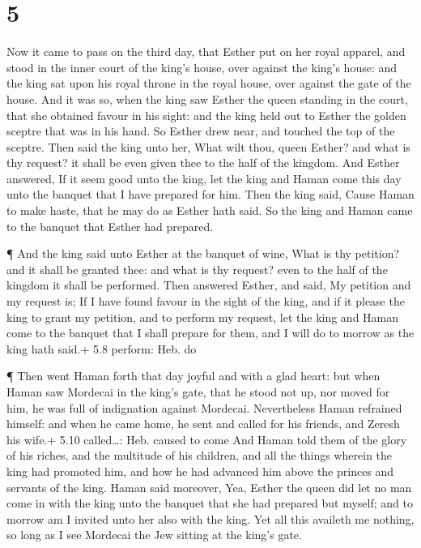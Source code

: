 \hypertarget{section-4}{%
\section{5}\label{section-4}}

 Now it came to pass on the third day, that Esther put on
her royal apparel, and stood in the inner court of the king's house,
over against the king's house: and the king sat upon his royal throne in
the royal house, over against the gate of the house.  And it
was so, when the king saw Esther the queen standing in the court, that
she obtained favour in his sight: and the king held out to Esther the
golden sceptre that was in his hand. So Esther drew near, and touched
the top of the sceptre.  Then said the king unto her, What
wilt thou, queen Esther? and what is thy request? it shall be even given
thee to the half of the kingdom.  And Esther answered, If it
seem good unto the king, let the king and Haman come this day unto the
banquet that I have prepared for him.  Then the king said,
Cause Haman to make haste, that he may do as Esther hath said. So the
king and Haman came to the banquet that Esther had prepared.

 ¶ And the king said unto Esther at the banquet of wine,
What is thy petition? and it shall be granted thee: and what is thy
request? even to the half of the kingdom it shall be performed.
 Then answered Esther, and said, My petition and my request
is;  If I have found favour in the sight of the king, and if
it please the king to grant my petition, and to perform my request, let
the king and Haman come to the banquet that I shall prepare for them,
and I will do to morrow as the king hath said.+ 5.8 perform: Heb. do

 ¶ Then went Haman forth that day joyful and with a glad
heart: but when Haman saw Mordecai in the king's gate, that he stood not
up, nor moved for him, he was full of indignation against Mordecai.
 Nevertheless Haman refrained himself: and when he came
home, he sent and called for his friends, and Zeresh his wife.+ 5.10
called\ldots: Heb. caused to come  And Haman told them of
the glory of his riches, and the multitude of his children, and all the
things wherein the king had promoted him, and how he had advanced him
above the princes and servants of the king.  Haman said
moreover, Yea, Esther the queen did let no man come in with the king
unto the banquet that she had prepared but myself; and to morrow am I
invited unto her also with the king.  Yet all this availeth
me nothing, so long as I see Mordecai the Jew sitting at the king's
gate.

